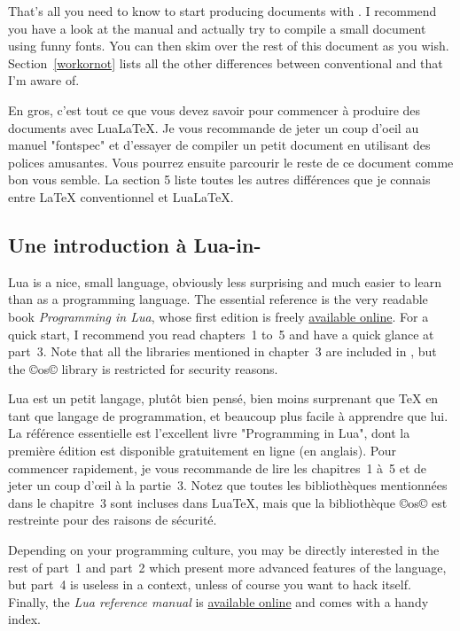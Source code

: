 \documentclass{lltxdoc}
\begin{document}
That's all you need to know to start producing documents with \lualatex. I
recommend you have a look at the  manual and actually try to
compile a small document using funny fonts. You can then skim over the rest of
this document as you wish. Section~\ref{workornot} lists all the other
differences between conventional \latex and \lualatex that I'm aware of.

En gros, c'est tout ce que vous devez savoir pour commencer à produire des documents avec LuaLaTeX. Je vous recommande de jeter un coup d'oeil au manuel "fontspec" et d'essayer de compiler un petit document en utilisant des polices amusantes. Vous pourrez ensuite parcourir le reste de ce document comme bon vous semble. La section 5 liste toutes les autres différences que je connais entre LaTeX conventionnel et LuaLaTeX.

\subsection{Une introduction à Lua-in-\tex}\label{luaintex}

Lua is a nice, small language, obviously less surprising and much easier to
learn than \tex as a programming language. The essential reference is the very
readable book \emph{Programming in Lua}, whose first edition is freely
\href{http://www.lua.org/pil/}{available online}. For a quick start, I
recommend you read chapters~1 to~5 and have a quick glance at part~3. Note
that all the libraries mentioned in chapter~3 are included in \luatex, but the
©os© library is restricted for security reasons.

Lua est un petit langage, plutôt bien pensé, bien moins surprenant que TeX en tant que langage de programmation, et beaucoup plus facile à apprendre que lui. La référence essentielle est l'excellent livre "Programming in Lua", dont la première édition est disponible gratuitement en ligne (en anglais). Pour commencer rapidement, je vous recommande de lire les chapitres~1 à~5 et de jeter un coup d'\oe il à la partie~3. Notez que toutes les bibliothèques mentionnées dans le chapitre~3 sont incluses dans LuaTeX, mais que la bibliothèque ©os© est restreinte pour des raisons de sécurité.

Depending on your programming culture, you may be directly interested in the
rest of part~1 and part~2 which present more advanced features of the
language, but part~4 is useless in a \luatex context, unless of course you
want to hack \luatex itself. Finally, the \emph{Lua reference manual} is
\href{http://www.lua.org/manual/5.2/}{available online} and
comes with a handy index.
\end{document}
